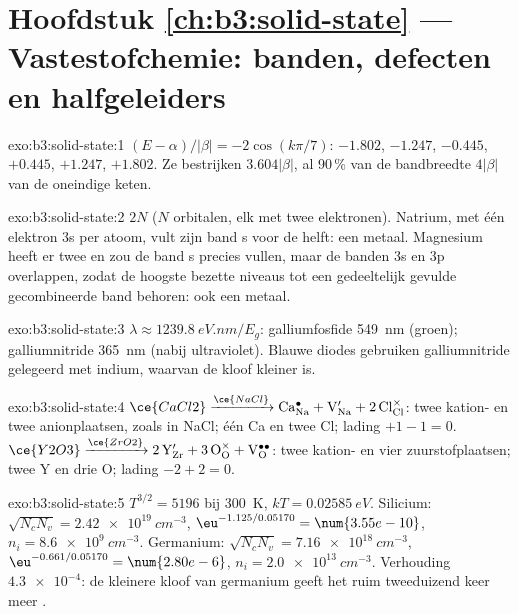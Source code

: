 \section*{Hoofdstuk \ref{ch:b3:solid-state} --- Vastestofchemie: banden, defecten en halfgeleiders}

\begin{solution}{exo:b3:solid-state:1}
$(E - \alpha)/|\beta| = -2\cos(k\pi/7)$: $-1.802$, $-1.247$, $-0.445$, $+0.445$, $+1.247$, $+1.802$. Ze bestrijken
$3.604|\beta|$, al 90\,\% van de bandbreedte $4|\beta|$ van de oneindige keten.
\end{solution}

\begin{solution}{exo:b3:solid-state:2}
$2N$ ($N$ orbitalen, elk met twee elektronen). Natrium, met één elektron 3s
per atoom, vult zijn band s voor de helft: een metaal. Magnesium heeft er
twee en zou de band s precies vullen, maar de banden 3s en 3p overlappen,
zodat de hoogste bezette niveaus tot een gedeeltelijk gevulde
gecombineerde band behoren: ook een metaal.
\end{solution}

\begin{solution}{exo:b3:solid-state:3}
$\lambda \approx \qty{1239.8}{eV.nm}/E_g$: galliumfosfide \qty{549}{nm} (groen); galliumnitride \qty{365}{nm}
(nabij ultraviolet). Blauwe diodes gebruiken galliumnitride gelegeerd met
indium, waarvan de kloof kleiner is.
\end{solution}

\begin{solution}{exo:b3:solid-state:4}
$\ce{CaCl2} \xrightarrow{\ce{NaCl}} \mathrm{Ca_{Na}^{\bullet} + V_{Na}' + 2\,Cl_{Cl}^{\times}}$: twee kation- en twee anionplaatsen, zoals in NaCl; één Ca en
twee Cl; lading $+1 - 1 = 0$. $\ce{Y2O3} \xrightarrow{\ce{ZrO2}} \mathrm{2\,Y_{Zr}' + 3\,O_O^{\times} + V_O^{\bullet\bullet}}$: twee kation- en vier zuurstofplaatsen; twee Y
en drie O; lading $-2 + 2 = 0$.
\end{solution}

\begin{solution}{exo:b3:solid-state:5}
$T^{3/2} = 5196$ bij \qty{300}{K}, $kT = \qty{0.02585}{eV}$. Silicium: $\sqrt{N_cN_v} = \qty{2.42e19}{cm^{-3}}$, $\eu^{-1.125/0.05170} = \num{3.55e-10}$,
$n_i = \qty{8.6e9}{cm^{-3}}$. Germanium: $\sqrt{N_cN_v} = \qty{7.16e18}{cm^{-3}}$, $\eu^{-0.661/0.05170} = \num{2.80e-6}$, $n_i = \qty{2.0e13}{cm^{-3}}$. Verhouding
$\num{4.3e-4}$: de kleinere kloof van germanium geeft het ruim tweeduizend
keer meer .
\end{solution}

